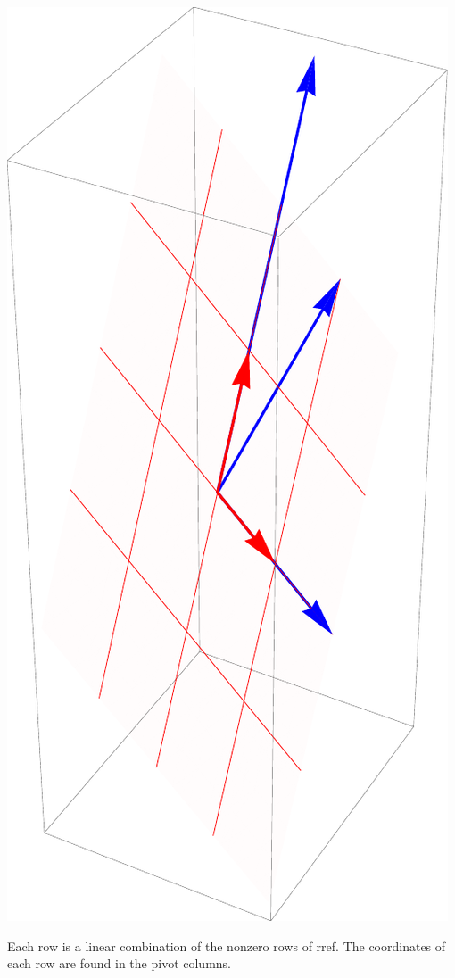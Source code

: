 \begin{example}
{\includegraphics[width=\marginparwidth]{02-Applications/support/rowspace2}

Each row is a linear combination of the nonzero rows of rref.  The coordinates of each row are found in the pivot columns.
}\end{example}

